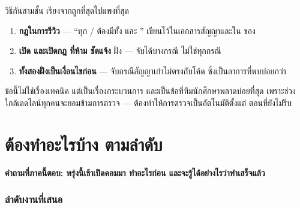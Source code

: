 วิธีกันสามชั้น เรียงจากถูกที่สุดไปแพงที่สุด

\begin{enumerate}
\item \textbf{กฎในการรีวิว } --- ``ทุก /
      ต้องมีทั้ง  และ '' เขียนไว้ในเอกสารสัญญาและใน
       ของ 
\item \textbf{เปิด  และเปิดกฎ  ที่ห้าม 
      ชัดแจ้ง} ฝั่ง  --- จับได้บางกรณี ไม่ใช่ทุกกรณี
\item \textbf{ ทั้งสองฝั่งเป็นเงื่อนไขก่อน } ---
      จับกรณีสัญญาเก่าไม่ตรงกับโค้ด ซึ่งเป็นอาการที่พบบ่อยกว่า
\end{enumerate}

\begin{keybox}[title={สัญญาที่ไม่มีใครบังคับ จะเน่าภายในสองสัปดาห์}]
ข้อนี้ไม่ใช่เรื่องเทคนิค แต่เป็นเรื่องกระบวนการ และเป็นข้อที่ทีมนักศึกษาพลาดบ่อยที่สุด
เพราะช่วงใกล้เดดไลน์ทุกคนจะยอมข้ามการตรวจ --- ต้องทำให้การตรวจเป็นอัตโนมัติตั้งแต่
ตอนที่ยังไม่รีบ
\end{keybox}

\clearpage

\part{ต้องทำอะไรบ้าง ตามลำดับ}

\textbf{คำถามที่ภาคนี้ตอบ: พรุ่งนี้เช้าเปิดคอมมา ทำอะไรก่อน และจะรู้ได้อย่างไรว่าทำเสร็จแล้ว}

\section{ลำดับงานที่เสนอ}

